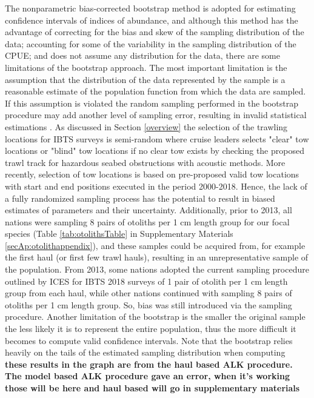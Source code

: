 \documentclass[a4paper 12pt]{article}
\numberwithin{equation}{section}
\begin{document}
{The nonparametric bias-corrected bootstrap method is adopted for estimating confidence intervals of indices of abundance, and although this method has the advantage of correcting for the bias and skew of the sampling distribution of the data; accounting for some of the variability in the sampling distribution of the CPUE;  and does not assume any distribution for the data, there are some limitations of the bootstrap approach. The most important limitation is the assumption that the distribution of the data represented by the sample is a reasonable estimate of the population function from which the data are sampled. If this assumption is violated the random sampling  performed in the bootstrap procedure may add another level of sampling error, resulting in invalid statistical estimations \citep{haukoos2005advanced}. As discussed in Section \ref{overview} the selection of the trawling locations for IBTS surveys is semi-random where cruise leaders selects "clear" tow locations or "blind" tow locations if no clear tow exists by checking the proposed trawl track for hazardous seabed obstructions with acoustic methods. More recently, selection of tow locations is based on pre-proposed valid tow locations with start and end positions executed in the period 2000-2018. Hence, the lack of a fully randomized sampling process has the potential to result in biased estimates of parameters and their uncertainty. Additionally, prior to 2013, all nations were sampling 8 pairs of otoliths per 1 cm length group for our focal species (Table \ref{tab:otolithsTable} in Supplementary Materials \ref{secAp:otolithappendix}), and these samples could be acquired from, for example the first haul (or first few trawl hauls), resulting in an unrepresentative sample of the population. From 2013, some nations adopted the current sampling procedure outlined by ICES for IBTS 2018 surveys of 1 pair of otolith per 1 cm length group from each haul, while other nations continued with sampling 8 pairs of otoliths per 1 cm length group. So, bias was still introduced via the sampling  procedure. Another limitation of the bootstrap is the smaller the original sample the less likely it is to represent the entire population, thus the more difficult it becomes to compute valid confidence intervals. Note that the bootstrap relies heavily on the tails of the estimated sampling distribution when computing \\

{\bf these results in the graph are from the haul based ALK procedure. The model based ALK procedure gave an error, when it's working those will be here and haul based will go in supplementary materials} 


}
\end{document}
